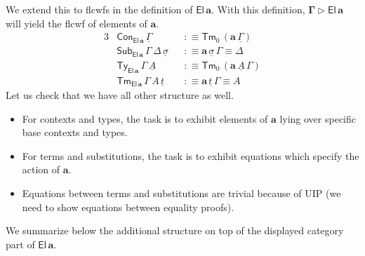 \documentclass[12pt,a4paper,twoside,openany]{book}
\theoremstyle{remark}
\theoremstyle{definition}
\theoremstyle{theorem}
\newcommand{\bs}[1]{\boldsymbol{#1}}
\newcommand{\Con}{\mathsf{Con}}
\newcommand{\Sub}{\mathsf{Sub}}
\newcommand{\Tm}{\mathsf{Tm}}
\newcommand{\Ty}{\mathsf{Ty}}
\newcommand{\El}{\mathsf{El}}
\newcommand{\ext}{\triangleright}
\newcommand{\ba}{\bs{a}}
\newcommand{\ul}[1]{\underline{#1}}
\newcommand{\ulGamma}{\ul{\Gamma}}
\newcommand{\ulsigma}{\ul{\sigma}}
\newcommand{\ult}{\ul{t}}
\newcommand{\ulA}{\ul{A}}
\newcommand{\defn}{:\equiv}
\begin{document}
We extend this to flcwfs in the definition of $\bs{\El\,a}$. With this
definition, $\bs{\Gamma \ext \El\,a}$ will yield the flcwf of elements of $\ba$.
\begin{alignat*}{3}
  &\Con_{\bs{\El\,a}}\,\ulGamma &&\defn \Tm_0\,(\ba\,\ulGamma) \\
  &\Sub_{\bs{\El\,a}}\,\Gamma\,\Delta\,\ulsigma &&\defn \ba\,\ulsigma\,\Gamma \equiv \Delta \\
  &\Ty_{\bs{\El\,a}}\,\Gamma\,\ulA &&\defn \Tm_0\,(\ba\,\ulA\,\Gamma)\\
  &\Tm_{\bs{\El\,a}}\,\Gamma\,A\,\ult &&\defn \ba\,\ult\,\Gamma \equiv A
\end{alignat*}
Let us check that we have all other structure as well.
\begin{itemize}
  \item For contexts and types, the task is to exhibit elements of $\ba$ lying over
        specific base contexts and types.
  \item For terms and substitutions, the task is to exhibit equations which
    specify the action of $\ba$.
  \item Equations between terms and substitutions are trivial because of UIP (we need
    to show equations between equality proofs).
\end{itemize}
We summarize below the additional structure on top of the displayed category
part of $\bs{\El\,a}$.
\end{document}
